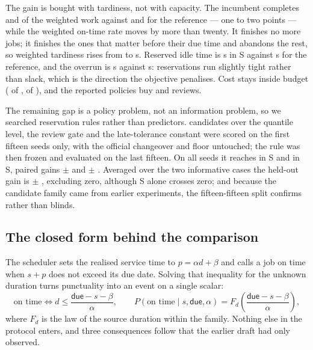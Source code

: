 \documentclass{swmcmthesis}
\begin{document}
The gain is bought with tardiness, not with capacity. The incumbent completes
\slotPStochSTwoSlackOldComp{} and \slotPStochSThreeSlackOldComp{} of the weighted
work against \slotPStochSTwoEDFOldComp{} and \slotPStochSThreeEDFOldComp{} for the
reference --- one to two points --- while the weighted on-time rate moves by more
than twenty. It finishes no more jobs; it finishes the ones that matter before their
due time and abandons the rest, so weighted tardiness rises from
\slotPStochSTwoEDFOldTard{} to \slotPStochSTwoSlackOldTard{} s. Reserved idle time is
\slotPStochSTwoSlackOldIdle{} s in S\slotCaseTwo{} against
\slotPStochSTwoEDFOldIdle{} s for the reference, and the overrun is
\slotPStochSTwoSlackOldOverrun{} s against \slotPStochSTwoEDFOldOverrun{} s:
reservations run slightly tight rather than slack, which is the direction the
objective penalises. Cost stays inside budget (\slotPStochSTwoSlackOldCost{} of
\slotBudgetSTwo{}, \slotPStochSThreeSlackOldCost{} of \slotBudgetSThree{}), and the
reported policies buy \slotPStochSTwoSlackOldReviews{} and
\slotPStochSThreeSlackOldReviews{} reviews.

The remaining gap is a policy problem, not an information problem, so we searched
reservation rules rather than predictors. \slotPImpNCandidates{} candidates over the
quantile level, the review gate and the late-tolerance constant were scored on the first
fifteen seeds only, with the official changeover and floor untouched; the rule was then
frozen and evaluated on the last fifteen. On all \slotNSeeds{} seeds it reaches
\slotPImpSTwoAllCand{} in S\slotCaseTwo{} and \slotPImpSThreeAllCand{} in S\slotCaseThree,
paired gains \slotPImpSTwoAllMean{} $\pm$ \slotPImpSTwoAllCI{} and \slotPImpSThreeAllMean{}
$\pm$ \slotPImpSThreeAllCI{}. Averaged over the two informative cases the held-out gain is
\slotPImpMixedHoldDelta{} $\pm$ \slotPImpMixedHoldCI{}, excluding zero, although
S\slotCaseThree{} alone crosses zero; and because the candidate family came from earlier
experiments, the fifteen-fifteen split confirms rather than blinds.


\subsection{The closed form behind the comparison}
\label{sec:p3closed}

The scheduler sets the realised service time to $p=\alpha d+\beta$ and calls a job on
time when $s+p$ does not exceed its due date. Solving that inequality for the unknown
duration turns punctuality into an event on a single scalar:
\begin{equation}
\text{on time}\iff d\le\frac{\textsf{due}-s-\beta}{\alpha},
\qquad
P(\text{on time}\mid s,\textsf{due},\alpha)
= F_d\!\left(\frac{\textsf{due}-s-\beta}{\alpha}\right),
\label{eq:cfprob}
\end{equation}
where $F_d$ is the law of the source duration within the family. Nothing else in the
protocol enters, and three consequences follow that the earlier draft had only observed.
\end{document}
